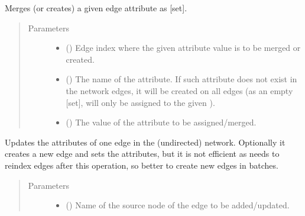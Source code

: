 \documentclass[letterpaper,10pt,english]{sphinxmanual}
\begin{document}
\begin{fulllineitems}
\begin{fulllineitems}
\label{\detokenize{reference:pypath.main.PyPath.add_set_eattr}}
Merges (or creates) a given edge attribute as {[}set{]}.
\begin{quote}\begin{description}
\item[{Parameters}] \leavevmode\begin{itemize}
\item {} 
 () \textendash{} Edge index where the given attribute value is to be merged
or created.

\item {} 
 () \textendash{} The name of the attribute. If such attribute does not exist
in the network edges, it will be created on all edges (as an
empty {[}set{]},  will only be assigned to the given
).

\item {} 
 () \textendash{} The value of the attribute to be assigned/merged.

\end{itemize}

\end{description}\end{quote}

\end{fulllineitems}


\begin{fulllineitems}
\label{\detokenize{reference:pypath.main.PyPath.add_update_edge}}
Updates the attributes of one edge in the (undirected) network.
Optionally it creates a new edge and sets the attributes, but it
is not efficient as  needs to reindex edges
after this operation, so better to create new edges in batches.
\begin{quote}\begin{description}
\item[{Parameters}] \leavevmode\begin{itemize}
\item {} 
 () \textendash{} Name of the source node of the edge to be added/updated.


\end{itemize}
\end{description}
\end{quote}
\end{fulllineitems}
\end{fulllineitems}
\end{document}
